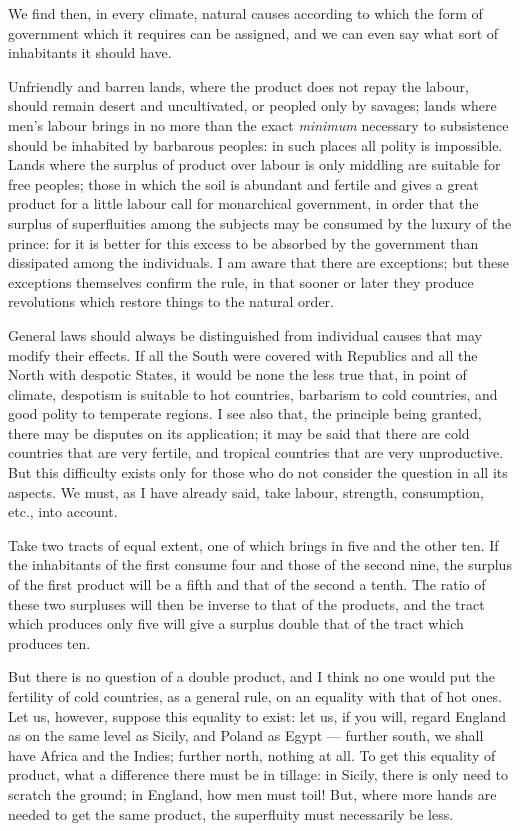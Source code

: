 \documentclass[12pt]{book}
\begin{document}
We find then, in every climate, natural causes according to which the form of government which it requires can be assigned, and we can even say what sort of inhabitants it should have.

Unfriendly and barren lands, where the product does not repay the labour, should remain desert and uncultivated, or peopled only by savages; lands where men's labour brings in no more than the exact \textit{minimum} necessary to subsistence should be inhabited by barbarous peoples: in such places all polity is impossible. Lands where the surplus of product over labour is only middling are suitable for free peoples; those in which the soil is abundant and fertile and gives a great product for a little labour call for monarchical government, in order that the surplus of superfluities among the subjects may be consumed by the luxury of the prince: for it is better for this excess to be absorbed by the government than dissipated among the individuals. I am aware that there are exceptions; but these exceptions themselves confirm the rule, in that sooner or later they produce revolutions which restore things to the natural order.

General laws should always be distinguished from individual causes that may modify their effects. If all the South were covered with Republics and all the North with despotic States, it would be none the less true that, in point of climate, despotism is suitable to hot countries, barbarism to cold countries, and good polity to temperate regions. I see also that, the principle being granted, there may be disputes on its application; it may be said that there are cold countries that are very fertile, and tropical countries that are very unproductive. But this difficulty exists only for those who do not consider the question in all its aspects. We must, as I have already said, take labour, strength, consumption, etc., into account.

Take two tracts of equal extent, one of which brings in five and the other ten. If the inhabitants of the first consume four and those of the second nine, the surplus of the first product will be a fifth and that of the second a tenth. The ratio of these two surpluses will then be inverse to that of the products, and the tract which produces only five will give a surplus double that of the tract which produces ten.

But there is no question of a double product, and I think no one would put the fertility of cold countries, as a general rule, on an equality with that of hot ones. Let us, however, suppose this equality to exist: let us, if you will, regard England as on the same level as Sicily, and Poland as Egypt — further south, we shall have Africa and the Indies; further north, nothing at all. To get this equality of product, what a difference there must be in tillage: in Sicily, there is only need to scratch the ground; in England, how men must toil! But, where more hands are needed to get the same product, the superfluity must necessarily be less.
\end{document}
